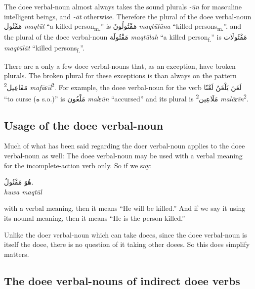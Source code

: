 \documentclass[
  10pt,
]{book}
\begin{document}
The doee verbal-noun almost always takes the sound plurals \emph{-ūn} for masculine intelligent beings, and \emph{-āt} otherwise. Therefore the plural of the doee verbal-noun
\foreignlanguage{arabic}{مَقْتُول} \emph{maqtūl} \enquote{a killed person\textsubscript{m.}} is \foreignlanguage{arabic}{مَقْتُولُونَ} \emph{maqtūlūna} \enquote{killed persons\textsubscript{m.}}.
and the plural of the doee verbal-noun
\foreignlanguage{arabic}{مَقْتُولَة} \emph{maqtūlah} \enquote{a killed person\textsubscript{f.}} is \foreignlanguage{arabic}{مَقْتُولَات} \emph{maqtūlāt} \enquote{killed persons\textsubscript{f.}}.

There are a only a few doee verbal-nouns that, as an exception, have broken plurals. The broken plural for these exceptions is than always on the pattern \textsuperscript{2}\foreignlanguage{arabic}{مَفَاعِيل} \emph{mafāɛīl}\textsuperscript{2}. For example, the doee verbal-noun for the verb
\foreignlanguage{arabic}{لَعَنَ يَلْعَنُ لَعْنًا} \enquote{to curse (\foreignlanguage{arabic}{ه} s.o.)} is \foreignlanguage{arabic}{مَلْعُون} \emph{malɛūn} \enquote{accursed} and its plural is \textsuperscript{2}\foreignlanguage{arabic}{مَلَاعِين} \emph{malāɛīn}\textsuperscript{2}.

\subsection{Usage of the doee verbal-noun}\label{usage-of-the-doee-verbal-noun}

Much of what has been said regarding the doer verbal-noun applies to the doee verbal-noun as well: The doee verbal-noun may be used with a verbal meaning for the incomplete-action verb only. So if we say:

\foreignlanguage{arabic}{هُوَ مَقْتُولٌ.}\\
\emph{huwa maqtūl}

with a verbal meaning, then it means \enquote{He will be killed.} And if we say it using its nounal meaning, then it means \enquote{He is the person killed.}

Unlike the doer verbal-noun which can take doees, since the doee verbal-noun is itself the doee, there is no question of it taking other doees. So this does simplify matters.

\subsection{The doee verbal-nouns of indirect doee verbs}\label{the-doee-verbal-nouns-of-indirect-doee-verbs}
\end{document}
